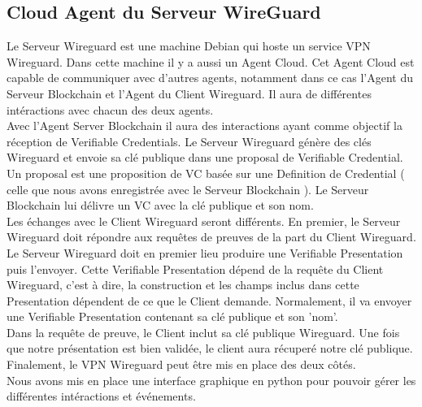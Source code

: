 \documentclass[12pt, openany]{report}
\begin{document}
\subsection{Cloud Agent du Serveur WireGuard}
\noindent 
\begin{flushleft}
Le Serveur Wireguard est une machine Debian qui hoste un service VPN Wireguard.  Dans cette machine il y a aussi un Agent Cloud. Cet Agent Cloud est capable de communiquer avec d'autres agents, notamment dans ce cas l'Agent du Serveur Blockchain et l'Agent du Client Wireguard. Il aura de différentes intéractions avec chacun des deux agents. \\
\vspace{2mm}
Avec l'Agent Server Blockchain il aura des interactions ayant comme objectif la réception de Verifiable Credentials. Le Serveur Wireguard génère des clés Wireguard et envoie sa clé publique dans une proposal de Verifiable Credential. Un proposal est une proposition de VC basée sur une Definition de Credential ( celle que nous avons enregistrée avec le Serveur Blockchain ). Le Serveur Blockchain lui délivre un VC avec la clé publique et son nom. \\
\vspace{2mm}
Les échanges avec le Client Wireguard seront différents. En premier, le Serveur Wireguard doit répondre aux requêtes de preuves de la part du Client Wireguard. Le Serveur Wireguard doit en premier lieu produire une Verifiable Presentation puis l'envoyer. Cette Verifiable Presentation dépend de la requête du Client Wireguard, c'est à dire, la construction et les champs inclus dans cette Presentation dépendent de ce que le Client demande. Normalement, il va envoyer une Verifiable Presentation contenant sa clé publique et son 'nom'. \\
Dans la requête de preuve, le Client inclut sa clé publique Wireguard. Une fois que notre présentation est bien validée, le client aura récuperé notre clé publique. Finalement, le VPN Wireguard peut être mis en place des deux côtés. \\

Nous avons mis en place une interface graphique en python pour pouvoir gérer les différentes intéractions et événements.\\


\end{flushleft}
\end{document}
